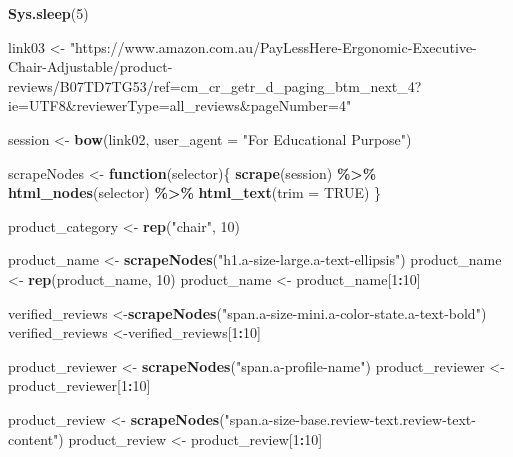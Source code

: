 \documentclass[
]{article}
\newenvironment{Shaded}{\begin{snugshade}}{\end{snugshade}}
\newcommand{\AttributeTok}[1]{\textcolor[rgb]{0.13,0.29,0.53}{#1}}
\newcommand{\ConstantTok}[1]{\textcolor[rgb]{0.56,0.35,0.01}{#1}}
\newcommand{\ControlFlowTok}[1]{\textcolor[rgb]{0.13,0.29,0.53}{\textbf{#1}}}
\newcommand{\DecValTok}[1]{\textcolor[rgb]{0.00,0.00,0.81}{#1}}
\newcommand{\FunctionTok}[1]{\textcolor[rgb]{0.13,0.29,0.53}{\textbf{#1}}}
\newcommand{\NormalTok}[1]{#1}
\newcommand{\OtherTok}[1]{\textcolor[rgb]{0.56,0.35,0.01}{#1}}
\newcommand{\SpecialCharTok}[1]{\textcolor[rgb]{0.81,0.36,0.00}{\textbf{#1}}}
\newcommand{\StringTok}[1]{\textcolor[rgb]{0.31,0.60,0.02}{#1}}
\begin{document}
\begin{Shaded}
\begin{Highlighting}[]
  \FunctionTok{Sys.sleep}\NormalTok{(}\DecValTok{5}\NormalTok{)}
  
\NormalTok{link03 }\OtherTok{\textless{}{-}} \StringTok{"https://www.amazon.com.au/PayLessHere{-}Ergonomic{-}Executive{-}Chair{-}Adjustable/product{-}reviews/B07TD7TG53/ref=cm\_cr\_getr\_d\_paging\_btm\_next\_4?ie=UTF8\&reviewerType=all\_reviews\&pageNumber=4"}


\NormalTok{  session }\OtherTok{\textless{}{-}} \FunctionTok{bow}\NormalTok{(link02,}
               \AttributeTok{user\_agent =} \StringTok{"For Educational Purpose"}\NormalTok{)}

\NormalTok{  scrapeNodes }\OtherTok{\textless{}{-}} \ControlFlowTok{function}\NormalTok{(selector)\{}
    \FunctionTok{scrape}\NormalTok{(session) }\SpecialCharTok{\%\textgreater{}\%}
      \FunctionTok{html\_nodes}\NormalTok{(selector) }\SpecialCharTok{\%\textgreater{}\%}
      \FunctionTok{html\_text}\NormalTok{(}\AttributeTok{trim =} \ConstantTok{TRUE}\NormalTok{)}
\NormalTok{  \}}

\NormalTok{  product\_category }\OtherTok{\textless{}{-}} \FunctionTok{rep}\NormalTok{(}\StringTok{"chair"}\NormalTok{, }\DecValTok{10}\NormalTok{)}

\NormalTok{  product\_name }\OtherTok{\textless{}{-}} \FunctionTok{scrapeNodes}\NormalTok{(}\StringTok{"h1.a{-}size{-}large.a{-}text{-}ellipsis"}\NormalTok{)}
\NormalTok{  product\_name }\OtherTok{\textless{}{-}} \FunctionTok{rep}\NormalTok{(product\_name, }\DecValTok{10}\NormalTok{)}
\NormalTok{  product\_name }\OtherTok{\textless{}{-}}\NormalTok{ product\_name[}\DecValTok{1}\SpecialCharTok{:}\DecValTok{10}\NormalTok{]}
  
\NormalTok{  verified\_reviews }\OtherTok{\textless{}{-}}\FunctionTok{scrapeNodes}\NormalTok{(}\StringTok{"span.a{-}size{-}mini.a{-}color{-}state.a{-}text{-}bold"}\NormalTok{)}
\NormalTok{  verified\_reviews }\OtherTok{\textless{}{-}}\NormalTok{verified\_reviews[}\DecValTok{1}\SpecialCharTok{:}\DecValTok{10}\NormalTok{]}
  
\NormalTok{  product\_reviewer }\OtherTok{\textless{}{-}} \FunctionTok{scrapeNodes}\NormalTok{(}\StringTok{"span.a{-}profile{-}name"}\NormalTok{)}
\NormalTok{  product\_reviewer }\OtherTok{\textless{}{-}}\NormalTok{ product\_reviewer[}\DecValTok{1}\SpecialCharTok{:}\DecValTok{10}\NormalTok{]}
  
\NormalTok{  product\_review }\OtherTok{\textless{}{-}} \FunctionTok{scrapeNodes}\NormalTok{(}\StringTok{"span.a{-}size{-}base.review{-}text.review{-}text{-}content"}\NormalTok{)}
\NormalTok{  product\_review }\OtherTok{\textless{}{-}}\NormalTok{ product\_review[}\DecValTok{1}\SpecialCharTok{:}\DecValTok{10}\NormalTok{]}
  

\end{Highlighting}
\end{Shaded}
\end{document}
